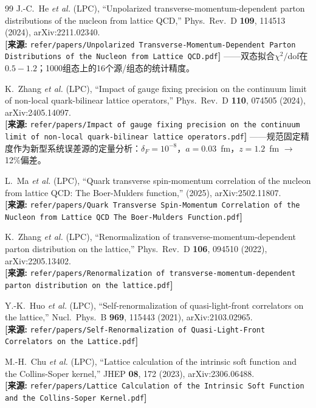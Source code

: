 \documentclass[12pt,a4paper]{ctexart}
\begin{document}
\begin{thebibliography}{99}
J.-C.~He \textit{et al.} (LPC),
``Unpolarized transverse-momentum-dependent parton distributions of the nucleon from lattice QCD,''
Phys.\ Rev.\ D \textbf{109}, 114513 (2024), arXiv:2211.02340.
\\\textbf{[来源:} \texttt{refer/papers/Unpolarized Transverse-Momentum-Dependent Parton Distributions of the Nucleon from Lattice QCD.pdf}\textbf{]}
——双态拟合$\chi^2/$dof在$0.5-1.2$；1000组态上的16个源/组态的统计精度。

K.~Zhang \textit{et al.} (LPC),
``Impact of gauge fixing precision on the continuum limit of non-local quark-bilinear lattice operators,''
Phys.\ Rev.\ D \textbf{110}, 074505 (2024), arXiv:2405.14097.
\\\textbf{[来源:} \texttt{refer/papers/Impact of gauge fixing precision on the continuum limit of non-local quark-bilinear lattice operators.pdf}\textbf{]}
——规范固定精度作为新型系统误差源的定量分析：$\delta_F = 10^{-8}$，$a=0.03$~fm，$z=1.2$~fm $\to$ 12\%偏差。

L.~Ma \textit{et al.} (LPC),
``Quark transverse spin-momentum correlation of the nucleon from lattice QCD: The Boer-Mulders function,''
(2025), arXiv:2502.11807.
\\\textbf{[来源:} \texttt{refer/papers/Quark Transverse Spin-Momentum Correlation of the Nucleon from Lattice QCD The Boer-Mulders Function.pdf}\textbf{]}

K.~Zhang \textit{et al.} (LPC),
``Renormalization of transverse-momentum-dependent parton distribution on the lattice,''
Phys.\ Rev.\ D \textbf{106}, 094510 (2022), arXiv:2205.13402.
\\\textbf{[来源:} \texttt{refer/papers/Renormalization of transverse-momentum-dependent parton distribution on the lattice.pdf}\textbf{]}

Y.-K.~Huo \textit{et al.} (LPC),
``Self-renormalization of quasi-light-front correlators on the lattice,''
Nucl.\ Phys.\ B \textbf{969}, 115443 (2021), arXiv:2103.02965.
\\\textbf{[来源:} \texttt{refer/papers/Self-Renormalization of Quasi-Light-Front Correlators on the Lattice.pdf}\textbf{]}

M.-H.~Chu \textit{et al.} (LPC),
``Lattice calculation of the intrinsic soft function and the Collins-Soper kernel,''
JHEP \textbf{08}, 172 (2023), arXiv:2306.06488.
\\\textbf{[来源:} \texttt{refer/papers/Lattice Calculation of the Intrinsic Soft Function and the Collins-Soper Kernel.pdf}\textbf{]}


\end{thebibliography}
\end{document}
